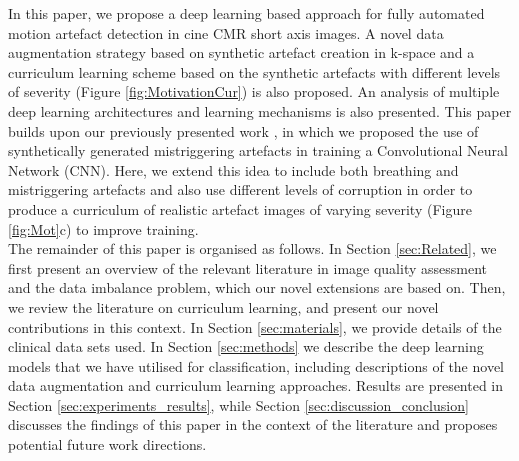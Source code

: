 \documentclass[preprint,12pt,authoryear]{elsarticle}
\begin{document}
In this paper, we propose a deep learning based approach for fully automated motion artefact detection in cine CMR short axis images. A novel data augmentation strategy based on synthetic artefact creation in k-space and a curriculum learning scheme based on the synthetic artefacts with different levels of severity (Figure \ref{fig:MotivationCur}) is also proposed. An analysis of multiple deep learning architectures and learning mechanisms is also presented. This paper builds upon our previously presented work \citep{Oksuz2018}, in which we proposed the use of synthetically generated mistriggering artefacts in training a Convolutional Neural Network (CNN). Here, we extend this idea to include both breathing and mistriggering artefacts and also use different levels of corruption in order to produce a curriculum of realistic artefact images of varying severity (Figure \ref{fig:Mot}c) to improve training.\\

The remainder of this paper is organised as follows. In Section \ref{sec:Related}, we first present an overview of the relevant literature in image quality assessment and the data imbalance problem, which our novel extensions are based on. 
Then, we review the literature on curriculum learning, and present our novel contributions in this context. 
In Section \ref{sec:materials}, we provide details of the clinical data sets used. 
In Section \ref{sec:methods} we describe the deep learning models that we have utilised for classification, including descriptions of the novel data augmentation and curriculum learning approaches. 
Results are presented in Section \ref{sec:experiments_results}, while Section \ref{sec:discussion_conclusion} discusses the findings of this paper in the context of the literature and proposes potential future work directions.
\end{document}
